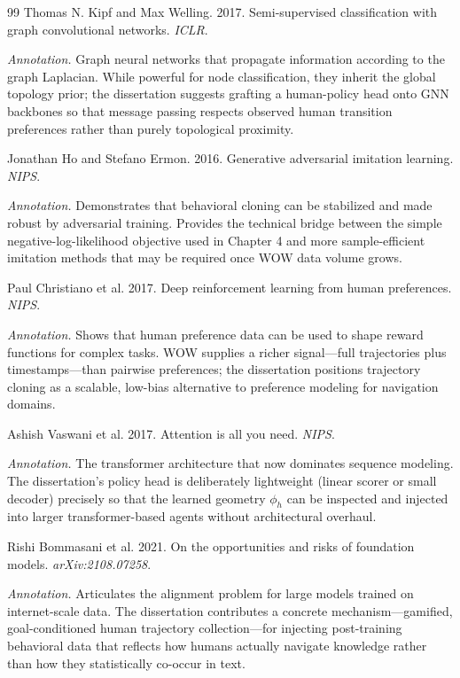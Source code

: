 \documentclass[11pt,a4paper]{report}
\begin{document}
\begin{thebibliography}{99}
Thomas N. Kipf and Max Welling. 2017. Semi-supervised classification with graph convolutional networks. \textit{ICLR}.

\textit{Annotation.} Graph neural networks that propagate information according to the graph Laplacian. While powerful for node classification, they inherit the global topology prior; the dissertation suggests grafting a human-policy head onto GNN backbones so that message passing respects observed human transition preferences rather than purely topological proximity.

Jonathan Ho and Stefano Ermon. 2016. Generative adversarial imitation learning. \textit{NIPS}.

\textit{Annotation.} Demonstrates that behavioral cloning can be stabilized and made robust by adversarial training. Provides the technical bridge between the simple negative-log-likelihood objective used in Chapter 4 and more sample-efficient imitation methods that may be required once WOW data volume grows.

Paul Christiano et al. 2017. Deep reinforcement learning from human preferences. \textit{NIPS}.

\textit{Annotation.} Shows that human preference data can be used to shape reward functions for complex tasks. WOW supplies a richer signal—full trajectories plus timestamps—than pairwise preferences; the dissertation positions trajectory cloning as a scalable, low-bias alternative to preference modeling for navigation domains.

Ashish Vaswani et al. 2017. Attention is all you need. \textit{NIPS}.

\textit{Annotation.} The transformer architecture that now dominates sequence modeling. The dissertation’s policy head is deliberately lightweight (linear scorer or small decoder) precisely so that the learned geometry \(\phi_h\) can be inspected and injected into larger transformer-based agents without architectural overhaul.

Rishi Bommasani et al. 2021. On the opportunities and risks of foundation models. \textit{arXiv:2108.07258}.

\textit{Annotation.} Articulates the alignment problem for large models trained on internet-scale data. The dissertation contributes a concrete mechanism—gamified, goal-conditioned human trajectory collection—for injecting post-training behavioral data that reflects how humans actually navigate knowledge rather than how they statistically co-occur in text.


\end{thebibliography}
\end{document}
